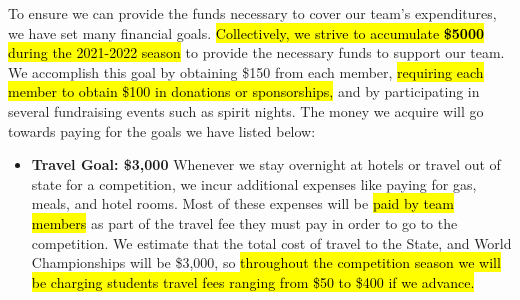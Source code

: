 To ensure we can provide the funds necessary to cover our team's expenditures, we have set many financial goals. \hl{Collectively, we strive to accumulate \textbf{\$5000} during the 2021-2022 season} to provide the necessary funds to support our team.  We accomplish this goal by obtaining \$150 from each member, \hl{requiring each member to obtain \$100 in donations or sponsorships,} and by participating in several fundraising events such as spirit nights. The money we acquire will go towards paying for the goals we have listed below:

\begin{itemize}
  \item \textbf{\Large Travel Goal: \$3,000 }
  \newline 
  Whenever we stay overnight at hotels or travel out of state for a competition, we incur additional expenses like paying for gas, meals, and hotel rooms. Most of these expenses will be \hl{paid by team members} as part of the travel fee they must pay in order to go to the competition. We estimate that the total cost of travel to the State, and World Championships will be \$3,000, so \hl{throughout the competition season we will be charging students travel fees ranging from \$50 to \$400 if we advance.}
  

\end{itemize}
